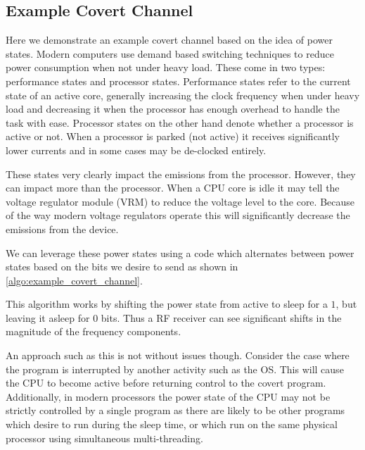   \subsection{Example Covert Channel}
    Here we demonstrate an example covert channel based on the idea of power states.
    Modern computers use demand based switching techniques to reduce power consumption when not under heavy load.
    These come in two types: performance states and processor states.
    Performance states refer to the current state of an active core, generally increasing the clock frequency
      when under heavy load and decreasing it when the processor has enough overhead to handle the task with ease.
    Processor states on the other hand denote whether a processor is active or not. 
    When a processor is parked (not active) it receives significantly lower currents and in some cases may be 
      de-clocked entirely.

    These states very clearly impact the emissions from the processor.
    However, they can impact more than the processor.
    When a CPU core is idle it may tell the voltage regulator module (VRM) to reduce the voltage level to the core.
    Because of the way modern voltage regulators operate this will significantly decrease the emissions from the device.

    We can leverage these power states using a code which alternates between power states based on the bits we desire 
      to send as shown in \autoref{algo:example_covert_channel}.

    \begin{algobox}
      \label{algo:example_covert_channel}
      
    \end{algobox}

    This algorithm works by shifting the power state from active to sleep for a $1$, but leaving it asleep for $0$ bits.
    Thus a RF receiver can see significant shifts in the magnitude of the frequency components.
    
    An approach such as this is not without issues though.
    Consider the case where the program is interrupted by another activity such as the OS.
    This will cause the CPU to become active before returning control to the covert program.
    Additionally, in modern processors the power state of the CPU may not be strictly controlled by a single program
      as there are likely to be other programs which desire to run during the sleep time, or which run on the same
      physical processor using simultaneous multi-threading.

